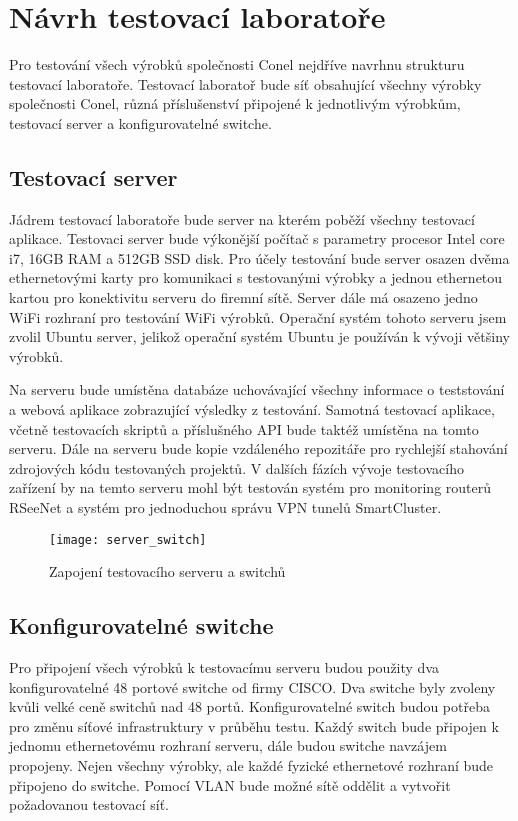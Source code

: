 \chapter{Návrh testovací laboratoře}

Pro testování všech výrobků společnosti Conel nejdříve navrhnu strukturu testovací laboratoře.  Testovací laboratoř bude síť obsahující všechny výrobky společnosti Conel, různá příslušenství připojené k jednotlivým výrobkům, testovací server a konfigurovatelné switche.

\section{Testovací server}
Jádrem testovací laboratoře bude server na kterém poběží všechny testovací aplikace. Testovaci server bude výkonější počítač s parametry procesor Intel core i7, 16GB RAM a 512GB SSD disk. Pro účely testování bude server osazen dvěma ethernetovými karty pro komunikaci s testovanými výrobky a jednou ethernetou kartou pro konektivitu serveru do firemní sítě. Server dále má osazeno jedno WiFi rozhraní pro testování WiFi výrobků. Operační systém tohoto serveru jsem zvolil Ubuntu server, jelikož operační systém Ubuntu je používán k vývoji většiny výrobků.

Na serveru bude umístěna databáze uchovávající všechny informace o teststování a webová aplikace zobrazující výsledky z testování. Samotná testovací aplikace, včetně testovacích skriptů a příslušného API bude taktéž umístěna na tomto serveru. Dále na serveru bude kopie vzdáleného repozitáře pro rychlejší stahování zdrojových kódu testovaných projektů. V dalších fázích vývoje testovacího zařízení by na temto serveru mohl být testován systém pro monitoring routerů RSeeNet a systém pro jednoduchou správu VPN tunelů SmartCluster.

\begin{figure}[h]
  \centering
  \texttt{[image: server\_switch]}
  \caption{Zapojení testovacího serveru a switchů}
  \label{fig:server_switch}
\end{figure}

\section{Konfigurovatelné switche}
Pro připojení všech výrobků k testovacímu serveru budou použity dva konfigurovatelné 48 portové switche od firmy CISCO. Dva switche byly zvoleny kvůli velké ceně switchů nad 48 portů. Konfigurovatelné switch budou potřeba pro změnu síťové infrastruktury v průběhu testu. Každý switch bude připojen k jednomu ethernetovému rozhraní serveru, dále budou switche navzájem propojeny. Nejen všechny výrobky, ale každé fyzické ethernetové rozhraní bude připojeno do switche. Pomocí VLAN bude možné sítě oddělit a vytvořit požadovanou testovací síť.


